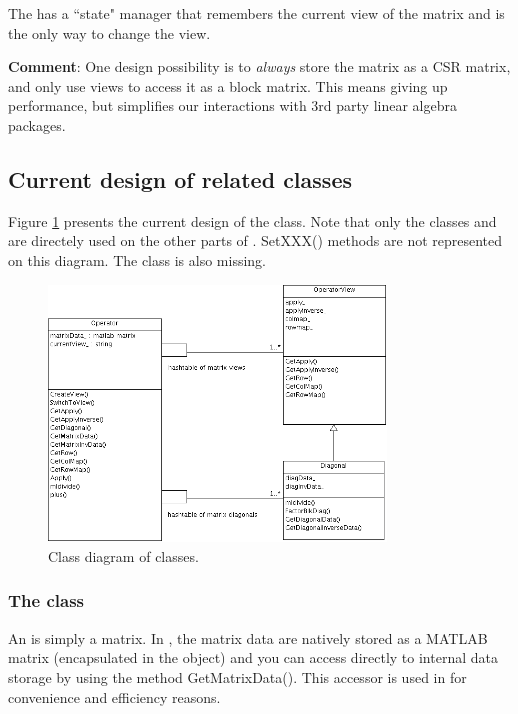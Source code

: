 \item The \operator has a ``state" manager that remembers the current view of the matrix and is the only way
to change the view.

\ee

\noindent
{\bf Comment}:  One design possibility is to {\em always} store the matrix as a CSR matrix, and only use views to access
it as a block matrix.  This means giving up performance, but simplifies our interactions with 3rd party linear algebra
packages.


\subsection{Current design of \Operator related classes}
Figure \ref{fig:current:OperatorClassDiagram} presents the current design of the \Operator class. Note that only the classes \Operator and \Diagonal are directely used on the other parts of \muemat.
SetXXX() methods are not represented on this diagram. The \Map class is also missing.

\begin{figure}
\centering  \includegraphics[angle=90,width=0.8\textwidth]{figs/MueMatOperatorClassDiagram.png}
  \caption{Class diagram of \Operator classes.}
  \label{fig:current:OperatorClassDiagram}
\end{figure}

\subsubsection{The \Operator class}
An \Operator is simply a matrix. In \muemat, the matrix data are natively stored as a MATLAB matrix (encapsulated in the \Operator object) and you can access directly to internal data storage by using the method GetMatrixData().
This accessor is used in \muemat for convenience and efficiency reasons.\\

